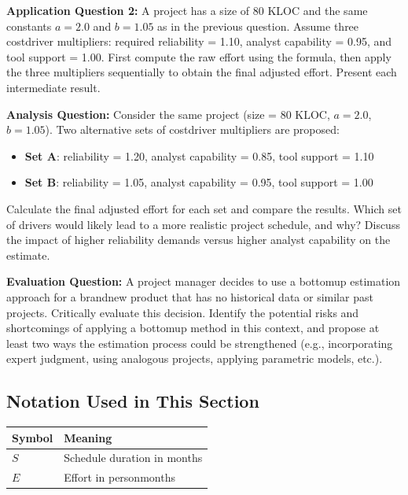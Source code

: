 \documentclass[12pt, a4paper]{article}
\begin{document}
\newpage

\textbf{Application Question 2:}  
A project has a size of 80 KLOC and the same constants \(a=2.0\) and \(b=1.05\) as in the previous question.  
Assume three costdriver multipliers: required reliability = 1.10, analyst capability = 0.95, and tool support = 1.00.  
First compute the raw effort using the formula, then apply the three multipliers sequentially to obtain the final adjusted effort. Present each intermediate result.  

\newpage

\textbf{Analysis Question:}  
Consider the same project (size = 80 KLOC, \(a=2.0\), \(b=1.05\)).  
Two alternative sets of costdriver multipliers are proposed:

\begin{itemize}
  \item \textbf{Set A}: reliability = 1.20, analyst capability = 0.85, tool support = 1.10
  \item \textbf{Set B}: reliability = 1.05, analyst capability = 0.95, tool support = 1.00
\end{itemize}

Calculate the final adjusted effort for each set and compare the results. Which set of drivers would likely lead to a more realistic project schedule, and why? Discuss the impact of higher reliability demands versus higher analyst capability on the estimate.  

\newpage

\textbf{Evaluation Question:}  
A project manager decides to use a bottomup estimation approach for a brandnew product that has no historical data or similar past projects. Critically evaluate this decision. Identify the potential risks and shortcomings of applying a bottomup method in this context, and propose at least two ways the estimation process could be strengthened (e.g., incorporating expert judgment, using analogous projects, applying parametric models, etc.).  

\newpage

\newpage

\subsection*{Notation Used in This Section}
\begin{tabular}{@{}ll@{}}
\toprule
Symbol & Meaning \\ \midrule
    $S$ & Schedule duration in months \\
    $E$ & Effort in personmonths \\
\bottomrule
\end{tabular}
\vspace{1em}
\end{document}
